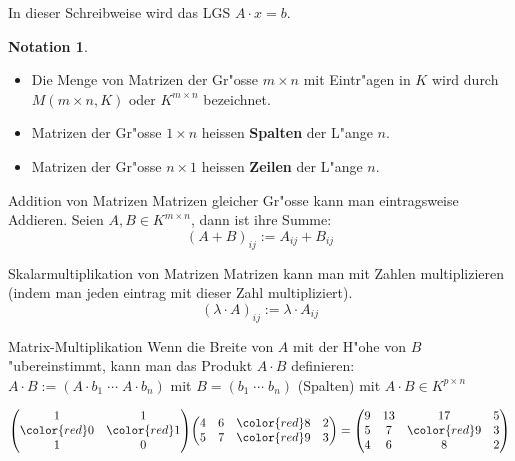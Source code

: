 \documentclass[oneside,fontsize=11pt,paper=a4,BCOR=0mm,DIV=12,automark,headsepline]{scrbook}
\theoremstyle{remark}
\theoremstyle{definition}
\newtheorem*{notation}{Notation}
\theoremstyle{definition}
\theoremstyle{remark}
\begin{document}
\begin{exa}
	 In dieser Schreibweise wird das LGS
	\(A\cdot x = b\).
\end{exa}
\begin{notation}$ $\newline
	\begin{itemize}
		\item Die Menge von Matrizen der Gr"osse \(m\times n\) mit Eintr"agen in \(K\) wird durch \(M(m\times n, K)\) oder \(K^{m\times n}\) bezeichnet. 
		\item Matrizen der Gr"osse \(1\times
		n\) heissen \textbf{Spalten} der L"ange \(n\). 
		\item Matrizen der Gr"osse \(n\times 1\) heissen
		\textbf{Zeilen} der L"ange \(n\).
	\end{itemize}
\end{notation}

\begin{definition}{Addition von Matrizen}{}
Matrizen gleicher Gr"osse kann man eintragsweise Addieren. Seien \(A,B \in K^{m\times n}\), dann ist ihre Summe: \[(A+B)_{ij}:=A_{ij}+B_{ij}\]
\end{definition}

\begin{definition}{Skalarmultiplikation von Matrizen}{}
Matrizen kann man mit Zahlen multiplizieren (indem man jeden eintrag mit dieser
Zahl multipliziert).
\[(\lambda \cdot A)_{ij}:=\lambda \cdot A_{ij}\]
\end{definition}

\begin{definition}{Matrix-Multiplikation}{}
Wenn die Breite von \(A\) mit der H"ohe von \(B\) "ubereinstimmt, kann man das
Produkt \(A\cdot B\) definieren: \\
\(A\cdot B:=(A\cdot b_1\; \cdots \; A\cdot b_n)\) mit \(B=(b_1\; \cdots\; b_n)\) (Spalten)
mit \(A\cdot B \in K^{p\times n}\)
\end{definition}
\begin{exa}
	\({\begin{pmatrix}1&1\\{\color {red}0}&{\color {red}1}\\1&0\end{pmatrix}}{\begin{pmatrix}4&6&{\color {red}8}&2\\5&7&{\color {red}9}&3\end{pmatrix}}={\begin{pmatrix}9&13&17&5\\5&7&{\color {red}9}&3\\4&6&8&2\end{pmatrix}}\)
\end{exa}
\end{document}
